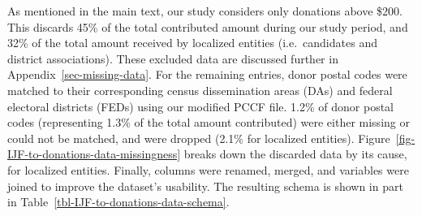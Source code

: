 \documentclass[
  letterpaper,
  DIV=11,
  numbers=noendperiod]{scrartcl}
\begin{document}
As mentioned in the main text, our study considers only donations above
\$200. This discards 45\% of the total contributed amount during our
study period, and 32\% of the total amount received by localized
entities (i.e.~candidates and district associations). These excluded
data are discussed further in Appendix~\ref{sec-missing-data}. For the
remaining entries, donor postal codes were matched to their
corresponding census dissemination areas (DAs) and federal electoral
districts (FEDs) using our modified PCCF file. 1.2\% of donor postal
codes (representing 1.3\% of the total amount contributed) were either
missing or could not be matched, and were dropped (2.1\% for localized
entities). Figure~\ref{fig-IJF-to-donations-data-missingness} breaks
down the discarded data by its cause, for localized entities. Finally,
columns were renamed, merged, and variables were joined to improve the
dataset's usability. The resulting schema is shown in part in
Table~\ref{tbl-IJF-to-donations-data-schema}.
\end{document}
